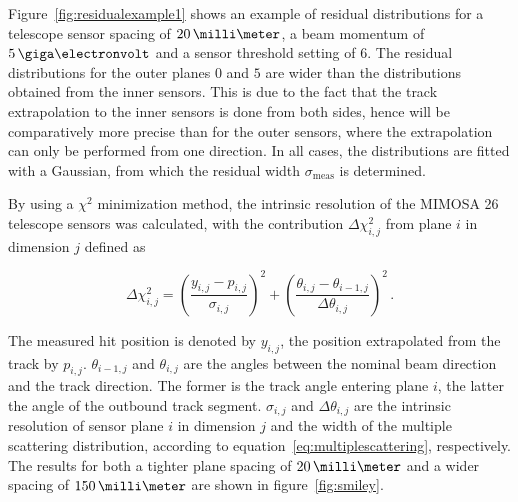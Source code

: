 Figure~\ref{fig:residualexample1} shows an example of residual distributions for a telescope sensor spacing of $20\,\milli\meter$, a beam momentum of $5\,\giga\electronvolt$ and a sensor threshold setting of $6$.
The residual distributions for the outer planes $0$ and $5$ are wider than the distributions obtained from the inner sensors.
This is due to the fact that the track extrapolation to the inner sensors is done from both sides, hence will be comparatively more precise than for the outer sensors, where the extrapolation can only be performed from one direction. 
In all cases, the distributions are fitted with a Gaussian, from which the residual width $\sigma_{\textrm{meas}}$ is determined.



% 

By using a $\chi^{2}$ minimization method, the intrinsic resolution of the {MIMOSA 26} telescope sensors was calculated, with the contribution $\Delta \chi^2_{i,j}$ from plane $i$ in dimension $j$ defined as

\begin{equation}
\Delta \chi^2_{i,j} = \left( \frac{y_{i,j} - p_{i,j}}{\sigma_{i,j}} \right)^2 +
\left( \frac{\theta_{i,j} - \theta_{i-1,j}}{\Delta \theta_{i,j}} \right)^2 \,.
\end{equation}

\noindent The measured hit position is denoted by $y_{i,j}$, the position extrapolated from the track by $p_{i,j}$. $\theta_{i-1,j}$ and $\theta_{i,j}$ are the angles between the nominal beam direction and the track direction. The former is the track angle entering plane $i$, the latter the angle of the outbound track segment.
$\sigma_{i,j}$ and $\Delta \theta_{i,j}$ are the intrinsic resolution of sensor plane $i$ in dimension $j$ and the width of the multiple scattering distribution, according to equation~\ref{eq:multiplescattering}, respectively.
The results for both a tighter plane spacing of $20\,\milli\meter$ and a wider spacing of $150\,\milli\meter$ are shown in figure~\ref{fig:smiley}.\\

